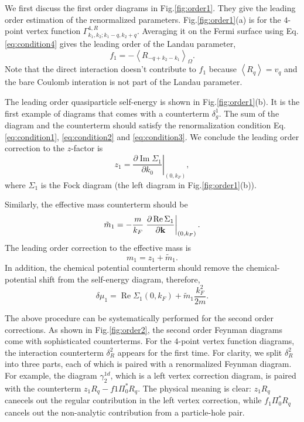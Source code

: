 \documentclass[reprint,amsmath,amssymb,aps,prb]{revtex4-1}
\begin{document}
We first discuss the first order diagrams in Fig.\ref{fig:order1}. They give the leading order
estimation of the renormalized parameters. Fig.\ref{fig:order1}(a) is for the $4$-point vertex function
$\Gamma^{4,R}_{k_1, k_2; k_1-q, k_2+q}$. Averaging it on the Fermi surface using Eq.\eqref{eq:condition4}
gives the leading order of the Landau parameter,
\begin{equation}
    f_1 = -\left< R_{-q+k_2-k_1}\right>_\Omega.
\end{equation}
Note that the direct interaction doesn't contribute to $f_1$ because
$\left<R_q\right>=v_q$ and the bare Coulomb interation is not part of the Landau parameter.

The leading order quasiparticle self-energy is shown in Fig.\eqref{fig:order1}(b).
It is the first example of diagrams that comes with a counterterm $\delta_g^1$. The sum of the diagram
and the counterterm should satisfy the renormalization condition Eq.\eqref{eq:condition1}, \eqref{eq:condition2} and \eqref{eq:condition3}.
We conclude the leading order correction to the $z$-factor is
\begin{equation}
    z_1 = \left. \frac{\partial \operatorname{Im} \Sigma_1}{\partial k_0} \right|_{(0, k_F)},
\end{equation}
where $\Sigma_1$ is the Fock diagram (the left diagram in Fig.\eqref{fig:order1}(b)).

Similarly, the effective mass counterterm should be
\begin{equation}
    \tilde{m}_1 = -\frac{m}{k_F}\left. \frac{\partial \operatorname{Re} \Sigma_1}{\partial \bold{k}} \right|_{(0, k_F)}.
\end{equation}
The leading order correction to the effective mass is
\begin{equation}
    m_1 = z_1+\tilde{m}_1.
\end{equation}
In addition, the chemical potential counterterm should remove the chemical-potential shift from the self-energy diagram, therefore,
\begin{equation}
    \delta \mu_1 = \operatorname{Re} \Sigma_1(0, k_F)+\tilde{m}_1\frac{k_F^2}{2m}.
\end{equation}

The above procedure can be systematically performed for the second order corrections.
As shown in Fig.\ref{fig:order2}, the second order Feynman diagrams come with sophisticated counterterms.
For the $4$-point vertex function diagrams, the interaction counterterm $\delta_R^2$ appears for the first time.
For clarity, we split $\delta_R^2$ into three parts, each of which is paired with a renormalized Feynman diagram.
For example, the diagram $\gamma_2^{1d}$, which is a left vertex correction diagram, is paired with the counterterm $z_1R_q-f1\Pi^*_0R_q$.
The physical meaning is clear: $z_1 R_q$ canecels out the regular contribution in the left vertex correction,
while $f_1\Pi_0^*R_q$ cancels out the non-analytic contribution from a particle-hole pair.
\end{document}
